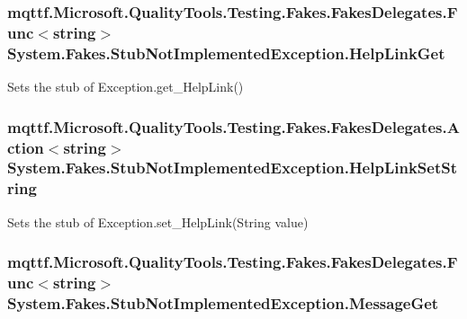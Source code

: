\hypertarget{class_system_1_1_fakes_1_1_stub_not_implemented_exception_affb6f9f7b9379a752ee513a1c36cbc0b}{
\subsubsection[{Help\-Link\-Get}]{\setlength{\rightskip}{0pt plus 5cm}mqttf.\-Microsoft.\-Quality\-Tools.\-Testing.\-Fakes.\-Fakes\-Delegates.\-Func$<$string$>$ System.\-Fakes.\-Stub\-Not\-Implemented\-Exception.\-Help\-Link\-Get}}\label{class_system_1_1_fakes_1_1_stub_not_implemented_exception_affb6f9f7b9379a752ee513a1c36cbc0b}


Sets the stub of Exception.\-get\-\_\-\-Help\-Link()

\hypertarget{class_system_1_1_fakes_1_1_stub_not_implemented_exception_aac0089129ee397524498c99dfec45c32}{
\subsubsection[{Help\-Link\-Set\-String}]{\setlength{\rightskip}{0pt plus 5cm}mqttf.\-Microsoft.\-Quality\-Tools.\-Testing.\-Fakes.\-Fakes\-Delegates.\-Action$<$string$>$ System.\-Fakes.\-Stub\-Not\-Implemented\-Exception.\-Help\-Link\-Set\-String}}\label{class_system_1_1_fakes_1_1_stub_not_implemented_exception_aac0089129ee397524498c99dfec45c32}


Sets the stub of Exception.\-set\-\_\-\-Help\-Link(\-String value)

\hypertarget{class_system_1_1_fakes_1_1_stub_not_implemented_exception_a13ee9582f79624dc0349af4777a62891}{
\subsubsection[{Message\-Get}]{\setlength{\rightskip}{0pt plus 5cm}mqttf.\-Microsoft.\-Quality\-Tools.\-Testing.\-Fakes.\-Fakes\-Delegates.\-Func$<$string$>$ System.\-Fakes.\-Stub\-Not\-Implemented\-Exception.\-Message\-Get}}\label{class_system_1_1_fakes_1_1_stub_not_implemented_exception_a13ee9582f79624dc0349af4777a62891}


